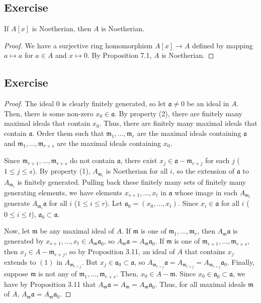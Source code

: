 \subsection{Exercise}\label{7.8}

If $A[x]$ is Noetherian, then $A$ is Noetherian.

\begin{proof}
We have a surjective ring homomorphism $A[x] \to A$ defined by mapping $a \mapsto a$ for $a \in A$ and $x \mapsto 0$. By Proposition 7.1, $A$
is Noetherian.
\end{proof}

\subsection{Exercise}\label{7.9}

\begin{proof}
The ideal $0$ is clearly finitely generated, so let $\mathfrak{a} \neq 0$ be an ideal in $A$. Then, there is some non-zero $x_0 \in \mathfrak{a}$.
By property (2), there are finitely many maximal ideals that contain $x_0$. Thus, there are finitely many maximal ideals that contain $\mathfrak{a}$.
Order them such that $\mathfrak{m}_1,\ldots,\mathfrak{m}_r$ are the maximal ideals containing $\mathfrak{a}$ and $\mathfrak{m}_1,\ldots,\mathfrak{m}_{r+s}$
are the maximal ideals containing $x_0$.

Since $\mathfrak{m}_{r+1},\ldots,\mathfrak{m}_{r+s}$ do not contain $\mathfrak{a}$, there exist $x_j \in \mathfrak{a} - \mathfrak{m}_{r+j}$ for each $j$ 
($1 \le j \le s$). By property (1), $A_{\mathfrak{m}_i}$ is Noetherian for all $i$, so the extension of $\mathfrak{a}$ to $A_{\mathfrak{m}_i}$ is finitely
generated. Pulling back these finitely many sets of finitely many generating elements, we have elements $x_{s+1},\ldots,x_t$ in $\mathfrak{a}$ whose image in
each $A_{\mathfrak{m}_i}$ generate $A_{\mathfrak{m}_i}\mathfrak{a}$ for all $i$ ($1 \le i \le r$). 
Let $\mathfrak{a}_0 = (x_0,\ldots,x_t)$. Since $x_i \in \mathfrak{a}$ for all $i$ ($0 \le i \le t$), $\mathfrak{a}_0 \subset \mathfrak{a}$. 

Now, let $\mathfrak{m}$ be any maximal ideal of $A$. If $\mathfrak{m}$ is one of $\mathfrak{m}_1,\ldots,\mathfrak{m}_r$, then $A_{\mathfrak{m}}\mathfrak{a}$ 
is generated by $x_{s+1},\ldots,x_t \in A_{\mathfrak{m}}\mathfrak{a}_0$, so $A_{\mathfrak{m}}\mathfrak{a} = A_{\mathfrak{m}}\mathfrak{a}_0$. If $\mathfrak{m}$
is one of $\mathfrak{m}_{r+1},\ldots,\mathfrak{m}_{r+s}$, then $x_j \in A - \mathfrak{m}_{r+j}$, so by Proposition 3.11, an ideal of $A$ that contains $x_j$
extends to $(1)$ in $A_{\mathfrak{m}_{r+j}}$. But $x_j \in \mathfrak{a}_0 \subset \mathfrak{a}$, so $A_{\mathfrak{m}_{r+j}}\mathfrak{a} = A_{\mathfrak{m}_{r+j}} 
= A_{\mathfrak{m}_{r+j}}\mathfrak{a}_0$. Finally, suppose $\mathfrak{m}$ is not any of $\mathfrak{m}_1,\ldots,\mathfrak{m}_{r+s}$. Then, $x_0 \in A - \mathfrak{m}$.
Since $x_0 \in \mathfrak{a}_0 \subset \mathfrak{a}$, we have by Proposition 3.11 that $A_{\mathfrak{m}}\mathfrak{a} = A_{\mathfrak{m}} = A_{\mathfrak{m}}\mathfrak{a}_0$.
Thus, for all maximal ideals $\mathfrak{m}$ of $A$, $A_{\mathfrak{m}}\mathfrak{a} = A_{\mathfrak{m}}\mathfrak{a}_0$.


\end{proof}
